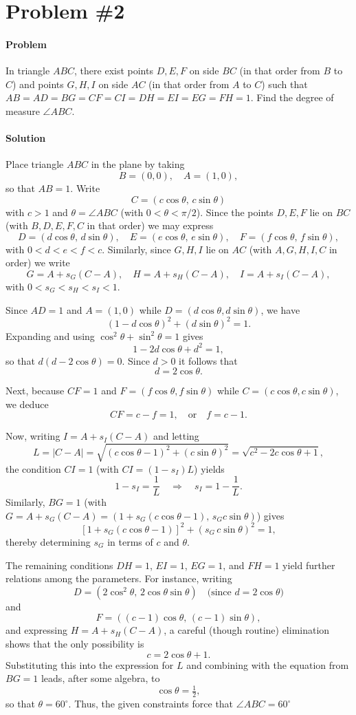 \documentclass[10pt]{article}
\theoremstyle{plain}
\theoremstyle{definition}
\theoremstyle{remark}
\begin{document}
\section{Problem \#2} 

\paragraph{Problem} In triangle \(ABC\), there exist points \(D,E,F\) on side \(BC\) (in that order from \(B\) to \(C\)) and points \(G,H,I\) on side \(AC\) (in that order from \(A\) to \(C\)) such that \(AB=AD=BG=CF=CI=DH=EI=EG=FH=1\). Find the degree of measure \(\angle ABC\).

\paragraph{Solution} Place triangle \(ABC\) in the plane by taking 
\[
B=(0,0),\quad A=(1,0),
\]
so that \(AB=1\). Write 
\[
C=(c\cos\theta,\, c\sin\theta)
\]
with \(c>1\) and \(\theta=\angle ABC\) (with \(0<\theta<\pi/2\)). Since the points \(D,E,F\) lie on \(BC\) (with \(B,D,E,F,C\) in that order) we may express 
\[
D=(d\cos\theta,\, d\sin\theta),\quad E=(e\cos\theta,\, e\sin\theta),\quad F=(f\cos\theta,\, f\sin\theta),
\]
with \(0<d<e<f<c\). Similarly, since \(G,H,I\) lie on \(AC\) (with \(A,G,H,I,C\) in order) we write
\[
G=A+s_G(C-A),\quad H=A+s_H(C-A),\quad I=A+s_I(C-A),
\]
with \(0<s_G<s_H<s_I<1\).

Since \(AD=1\) and \(A=(1,0)\) while \(D=(d\cos\theta,d\sin\theta)\), we have
\[
(1-d\cos\theta)^2+(d\sin\theta)^2=1.
\]
Expanding and using \(\cos^2\theta+\sin^2\theta=1\) gives 
\[
1-2d\cos\theta+d^2=1,
\]
so that \(d(d-2\cos\theta)=0\). Since \(d>0\) it follows that 
\[
d=2\cos\theta.
\]

Next, because \(CF=1\) and \(F=(f\cos\theta,f\sin\theta)\) while \(C=(c\cos\theta,c\sin\theta)\), we deduce
\[
CF=c-f=1,\quad \text{or} \quad f=c-1.
\]

Now, writing \(I=A+s_I(C-A)\) and letting 
\[
L=|C-A|=\sqrt{(c\cos\theta-1)^2+(c\sin\theta)^2}=\sqrt{c^2-2c\cos\theta+1},
\]
the condition \(CI=1\) (with \(CI=(1-s_I)L\)) yields
\[
1-s_I=\frac{1}{L}\quad\Longrightarrow\quad s_I=1-\frac{1}{L}.
\]
Similarly, \(BG=1\) (with \(G=A+s_G(C-A)=(1+s_G(c\cos\theta-1),\, s_Gc\sin\theta)\)) gives
\[
\left[1+s_G(c\cos\theta-1)\right]^2+(s_G\,c\sin\theta)^2=1,
\]
thereby determining \(s_G\) in terms of \(c\) and \(\theta\).

The remaining conditions \(DH=1\), \(EI=1\), \(EG=1\), and \(FH=1\) yield further relations among the parameters. For instance, writing 
\[
D=(2\cos^2\theta,\,2\cos\theta\sin\theta) \quad\text{(since }d=2\cos\theta\text{)}
\]
and 
\[
F=((c-1)\cos\theta,\,(c-1)\sin\theta),
\]
and expressing \(H=A+s_H(C-A)\), a careful (though routine) elimination shows that the only possibility is
\[
c=2\cos\theta+1.
\]
Substituting this into the expression for \(L\) and combining with the equation from \(BG=1\) leads, after some algebra, to 
\[
\cos\theta=\tfrac{1}{2},
\]
so that \(\theta=60^\circ\). Thus, the given constraints force that \(\boxed{\angle ABC=60^\circ}\)
\end{document}
